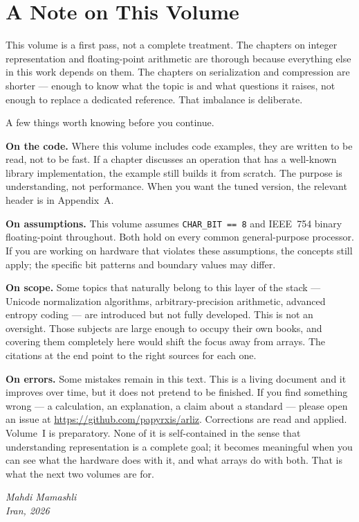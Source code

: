 {\small \linespread{1.35}\selectfont
\chapter*{A Note on This Volume}

This volume is a first pass, not a complete treatment. The chapters on
integer representation and floating-point arithmetic are thorough because
everything else in this work depends on them. The chapters on serialization
and compression are shorter --- enough to know what the topic is and what
questions it raises, not enough to replace a dedicated reference. That
imbalance is deliberate.

A few things worth knowing before you continue.

\medskip

\noindent\textbf{On the code.}\quad
Where this volume includes code examples, they are written to be read, not
to be fast. If a chapter discusses an operation that has a well-known
library implementation, the example still builds it from scratch. The
purpose is understanding, not performance. When you want the tuned version,
the relevant header is in Appendix~A.

\medskip

\noindent\textbf{On assumptions.}\quad
This volume assumes \texttt{CHAR\_BIT == 8} and IEEE~754 binary
floating-point throughout. Both hold on every common general-purpose
processor. If you are working on hardware that violates these assumptions,
the concepts still apply; the specific bit patterns and boundary values
may differ.

\medskip

\noindent\textbf{On scope.}\quad
Some topics that naturally belong to this layer of the stack --- Unicode
normalization algorithms, arbitrary-precision arithmetic, advanced entropy
coding --- are introduced but not fully developed. This is not an oversight.
Those subjects are large enough to occupy their own books, and covering
them completely here would shift the focus away from arrays. The citations
at the end point to the right sources for each one.

\medskip

\noindent\textbf{On errors.}\quad
Some mistakes remain in this text. This is a living document and it
improves over time, but it does not pretend to be finished. If you find
something wrong --- a calculation, an explanation, a claim about a
standard --- please open an issue at
\url{https://github.com/papyrxis/arliz}. Corrections are read and
applied.\\
\medskip
Volume~I is preparatory. None of it is self-contained in the sense that
understanding representation is a complete goal; it becomes meaningful when
you can see what the hardware does with it, and what arrays do with both.
That is what the next two volumes are for.

\begin{flushright}
  \textit{Mahdi Mamashli}\\
  \textit{Iran, 2026}
\end{flushright}

\clearpage
}